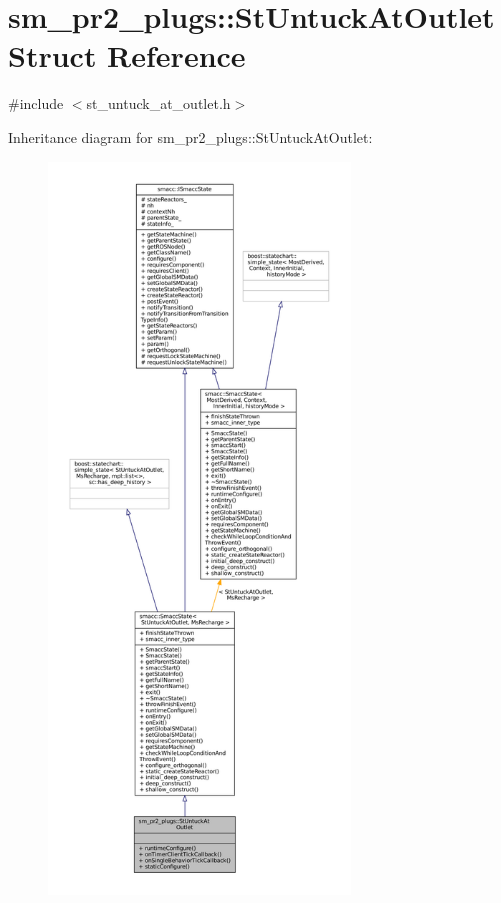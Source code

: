 \hypertarget{structsm__pr2__plugs_1_1StUntuckAtOutlet}{}\section{sm\+\_\+pr2\+\_\+plugs\+:\+:St\+Untuck\+At\+Outlet Struct Reference}
\label{structsm__pr2__plugs_1_1StUntuckAtOutlet}


{\ttfamily \#include $<$st\+\_\+untuck\+\_\+at\+\_\+outlet.\+h$>$}



Inheritance diagram for sm\+\_\+pr2\+\_\+plugs\+:\+:St\+Untuck\+At\+Outlet\+:
\nopagebreak
\begin{figure}[H]
\begin{center}
\leavevmode
\includegraphics[height=550pt]{structsm__pr2__plugs_1_1StUntuckAtOutlet__inherit__graph}
\end{center}
\end{figure}


